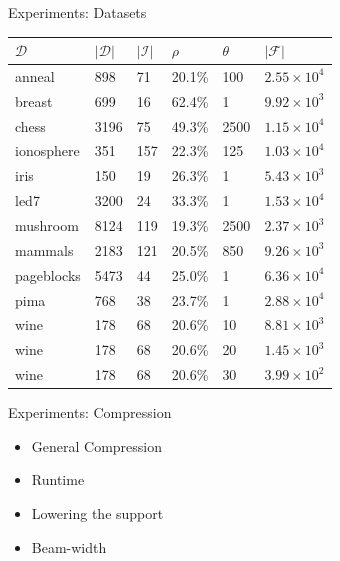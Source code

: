 \documentclass{beamer}
\newcommand{\dataset}{\mathcal{D}}
\newcommand{\itemset}{\mathcal{I}}
\newcommand{\setitemsets}{\mathcal{F}}
\begin{document}
\begin{frame}{Experiments: Datasets}
\begin{table}[H]
\centering
\begin{tabular}{l||l|l|l|l|l}
$\dataset$    & $|\dataset|$  & $|\itemset|$ & $\rho$  & $\theta$    & $|\setitemsets|$  \\ \hline
anneal        & 898           & 71           & 20.1\%  & 100         & $2.55\times10^{4}$ \\
breast        & 699           & 16           & 62.4\%  & 1           & $9.92\times10^{3}$ \\
chess         & 3196          & 75           & 49.3\%  & 2500        & $1.15\times10^{4}$ \\
ionosphere    & 351           & 157          & 22.3\%  & 125         & $1.03\times10^{4}$ \\
iris          & 150           & 19           & 26.3\%  & 1           & $5.43\times10^{3}$ \\
led7          & 3200          & 24           & 33.3\%  & 1           & $1.53\times10^{4}$ \\
mushroom      & 8124          & 119          & 19.3\%  & 2500        & $2.37\times10^{3}$ \\
mammals       & 2183          & 121          & 20.5\%  & 850         & $9.26\times10^{3}$ \\
pageblocks    & 5473          & 44           & 25.0\%  & 1           & $6.36\times10^{4}$ \\
pima          & 768           & 38           & 23.7\%  & 1           & $2.88\times10^{4}$ \\
wine          & 178           & 68           & 20.6\%  & 10          & $8.81\times10^{3}$ \\
wine          & 178           & 68           & 20.6\%  & 20          & $1.45\times10^{3}$ \\
wine          & 178           & 68           & 20.6\%  & 30          & $3.99\times10^{2}$ \\
\end{tabular}
\end{table}
\end{frame}

\begin{frame}{Experiments: Compression}
	\begin{itemize}
		\item General Compression
		\item Runtime
		\item Lowering the support
		\item Beam-width
	\end{itemize}
\end{frame}
\end{document}
